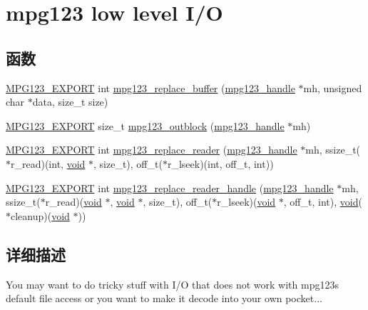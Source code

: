 \hypertarget{group__mpg123__lowio}{}\section{mpg123 low level I/O}
\label{group__mpg123__lowio}
\subsection*{函数}
\begin{DoxyCompactItemize}
\item 
\hyperlink{mpg123_8h_a2ba98cfba3f760879df70e755b2a61cc}{M\+P\+G123\+\_\+\+E\+X\+P\+O\+RT} int \hyperlink{group__mpg123__lowio_gaaae8cfb0de3a2bc1dc97d916aa519772}{mpg123\+\_\+replace\+\_\+buffer} (\hyperlink{group__mpg123__init_ga6728e2839a395f3a07d4514da659faca}{mpg123\+\_\+handle} $\ast$mh, unsigned char $\ast$data, size\+\_\+t size)
\item 
\hyperlink{mpg123_8h_a2ba98cfba3f760879df70e755b2a61cc}{M\+P\+G123\+\_\+\+E\+X\+P\+O\+RT} size\+\_\+t \hyperlink{group__mpg123__lowio_ga00c0874bdad4a3f6366a035694f298d6}{mpg123\+\_\+outblock} (\hyperlink{group__mpg123__init_ga6728e2839a395f3a07d4514da659faca}{mpg123\+\_\+handle} $\ast$mh)
\item 
\hyperlink{mpg123_8h_a2ba98cfba3f760879df70e755b2a61cc}{M\+P\+G123\+\_\+\+E\+X\+P\+O\+RT} int \hyperlink{group__mpg123__lowio_ga00a65b6bc6d3e56e3c055943c30894ab}{mpg123\+\_\+replace\+\_\+reader} (\hyperlink{group__mpg123__init_ga6728e2839a395f3a07d4514da659faca}{mpg123\+\_\+handle} $\ast$mh, ssize\+\_\+t($\ast$r\+\_\+read)(int, \hyperlink{interfacevoid}{void} $\ast$, size\+\_\+t), off\+\_\+t($\ast$r\+\_\+lseek)(int, off\+\_\+t, int))
\item 
\hyperlink{mpg123_8h_a2ba98cfba3f760879df70e755b2a61cc}{M\+P\+G123\+\_\+\+E\+X\+P\+O\+RT} int \hyperlink{group__mpg123__lowio_ga61a125c56f2aab9590a4b1a29194dc10}{mpg123\+\_\+replace\+\_\+reader\+\_\+handle} (\hyperlink{group__mpg123__init_ga6728e2839a395f3a07d4514da659faca}{mpg123\+\_\+handle} $\ast$mh, ssize\+\_\+t($\ast$r\+\_\+read)(\hyperlink{interfacevoid}{void} $\ast$, \hyperlink{interfacevoid}{void} $\ast$, size\+\_\+t), off\+\_\+t($\ast$r\+\_\+lseek)(\hyperlink{interfacevoid}{void} $\ast$, off\+\_\+t, int), \hyperlink{interfacevoid}{void}($\ast$cleanup)(\hyperlink{interfacevoid}{void} $\ast$))
\end{DoxyCompactItemize}


\subsection{详细描述}
You may want to do tricky stuff with I/O that does not work with mpg123\textquotesingle{}s default file access or you want to make it decode into your own pocket... 

